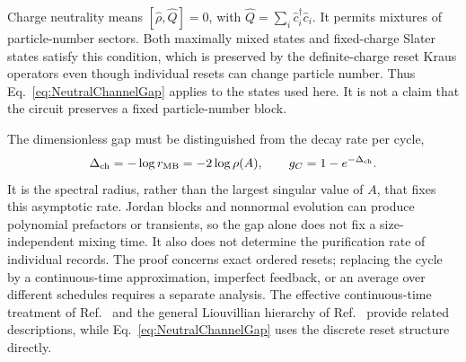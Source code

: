 \documentclass[aps,prb,10pt,twocolumn,superscriptaddress,longbibliography,floatfix]{revtex4-2}
\begin{document}
{Charge neutrality means $[\hat\rho,\hat Q]=0$, with $\hat Q=\sum_i\hat c_i^\dagger\hat c_i$. It permits mixtures of particle-number sectors. Both maximally mixed states and fixed-charge Slater states satisfy this condition, which is preserved by the definite-charge reset Kraus operators even though individual resets can change particle number. Thus Eq.~\eqref{eq:NeutralChannelGap} applies to the states used here. It is not a claim that the circuit preserves a fixed particle-number block.

The dimensionless gap must be distinguished from the decay rate per cycle,
\begin{equation}
    \Delta_{\rm ch}=-\log r_{\rm MB}=-2\log\rho(A),
    \qquad g_C=1-e^{-\Delta_{\rm ch}}.
    \label{eq:ChannelRateVersusGap}
\end{equation}
It is the spectral radius, rather than the largest singular value of $A$, that fixes this asymptotic rate. Jordan blocks and nonnormal evolution can produce polynomial prefactors or transients, so the gap alone does not fix a size-independent mixing time. It also does not determine the purification rate of individual records. The proof concerns exact ordered resets; replacing the cycle by a continuous-time approximation, imperfect feedback, or an average over different schedules requires a separate analysis. The effective continuous-time treatment of Ref.~\cite{BhuiyanPanJian2026} and the general Liouvillian hierarchy of Ref.~\cite{BarthelZhang2022} provide related descriptions, while Eq.~\eqref{eq:NeutralChannelGap} uses the discrete reset structure directly.
}




\end{document}
